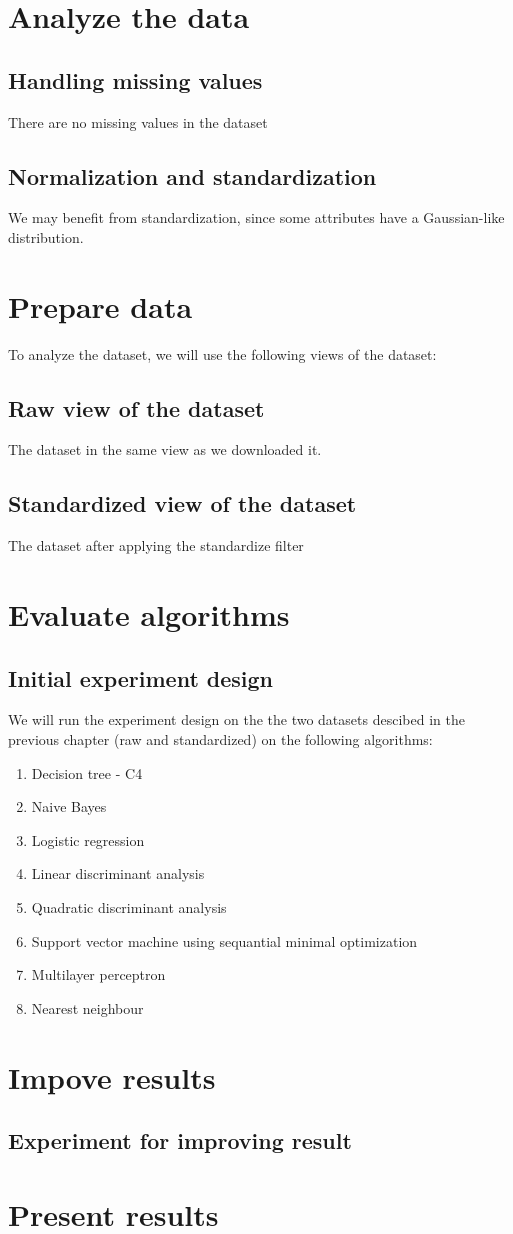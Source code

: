 \chapter{Analyze the data}
\section{Handling missing values}
There are no missing values in the dataset
\section{Normalization and standardization}
We may benefit from standardization, since some attributes have a Gaussian-like distribution.

\chapter{Prepare data}
To analyze the dataset, we will use the following views of the dataset:
\section{Raw view of the dataset}
The dataset in the same view as we downloaded it.
\section{Standardized view of the dataset}
The dataset after applying the standardize filter

\chapter{Evaluate algorithms}
\section{Initial experiment design}
We will run the experiment design on the the two datasets descibed in the previous chapter (raw and standardized) on the following algorithms:
\begin{enumerate}
    \item Decision tree - C4
    \item Naive Bayes
    \item Logistic regression
    \item Linear discriminant analysis
    \item Quadratic discriminant analysis
    \item Support vector machine using sequantial minimal optimization
    \item Multilayer perceptron 
    \item Nearest neighbour
\end{enumerate}

\chapter{Impove results}
\section{Experiment for improving result}

\chapter{Present results}